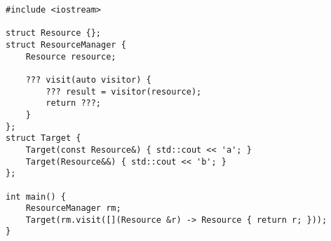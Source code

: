 \begin{lstlisting}[title=\href{https://godbolt.org/z/bGe-x9}{\texttt{godbolt.org/z/bGe-x9}}]
#include <iostream>

struct Resource {};
struct ResourceManager {
    Resource resource;

    ??? visit(auto visitor) {
        ??? result = visitor(resource);
        return ???;
    }
};
struct Target {
    Target(const Resource&) { std::cout << 'a'; }
    Target(Resource&&) { std::cout << 'b'; }
};

int main() {
    ResourceManager rm;
    Target(rm.visit([](Resource &r) -> Resource { return r; }));
}
\end{lstlisting}
